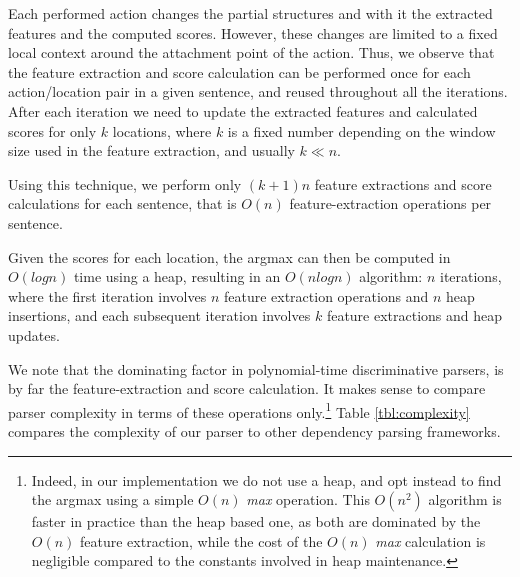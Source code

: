 \documentclass[11pt]{article}
\begin{document}
Each performed action changes the partial structures and with it the extracted features and the computed scores.  However, these changes are limited to a fixed local context around the attachment point of the action.  
Thus, we observe that the feature extraction and score calculation can be performed once for each action/location pair in a given sentence, and reused throughout all the iterations.  After each iteration we need to update the extracted features and calculated scores for only $k$ locations, where $k$ is a fixed number depending on the window size used in the feature extraction, and usually $k \ll n$.

Using this technique, we perform only $(k+1)n$ feature extractions and score calculations for each sentence, that is $O(n)$ feature-extraction operations per sentence.

Given the scores for each location, the argmax can then be computed in $O(logn)$ time using a heap, resulting in an $O(nlogn)$ algorithm: $n$ iterations, where the first iteration involves $n$ feature extraction operations and $n$ heap insertions, and each subsequent iteration involves $k$ feature extractions and heap updates.

We note that the dominating factor in polynomial-time discriminative parsers, is by far the feature-extraction and score calculation.  It makes sense to compare parser complexity in terms of these operations only.\footnote{Indeed, in our implementation we do not use a heap, and opt instead to find the argmax using a simple $O(n)$ \textit{max} operation.  This $O(n^2)$ algorithm is faster in practice than the heap based one, as both are dominated by the $O(n)$ feature extraction, while the cost of the $O(n)$ \textit{max} calculation%
 is negligible compared to the constants involved in heap maintenance.}
Table \ref{tbl:complexity} compares the complexity of our parser to other dependency parsing frameworks.

\begin{table}[h]
   \begin{center}
   \end{center}
   \caption{Complexity of different parsing frameworks.  \textsc{Mst}: first order MST parser, \textsc{Mst2}: second order MST parser, \textsc{Malt}: shift-reduce left-to-right %
   parsing. \textsc{Beam}: beam search parser, as in \cite{tale-two-parsers} }
   \label{tbl:complexity}
\end{table}
\end{document}
